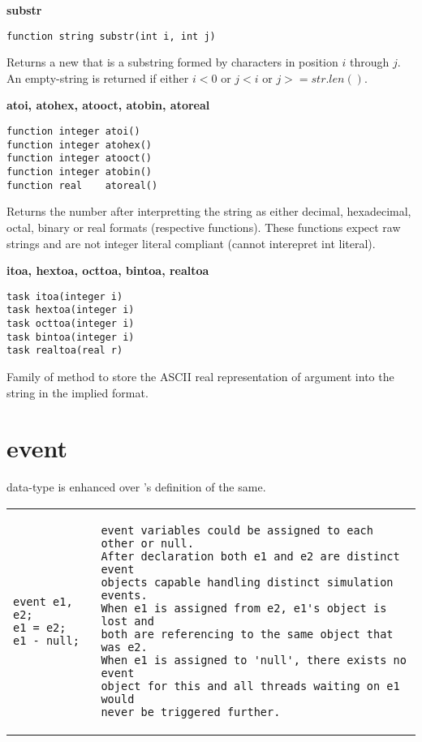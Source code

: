 \begin{description}
\item{{\bf substr}}
\begin{Verbatim}[formatcom=\color{blue}, fillcolor=\color{cyan}]
function string substr(int i, int j)
\end{Verbatim}
Returns a new \kwstring that is a substring formed by characters in
position $i$ through $j$. An empty-string is returned if either $i <
0$ or $j < i$ or $j >= str.len()$.

\item{{\bf atoi, atohex, atooct, atobin, atoreal}}
\begin{Verbatim}[formatcom=\color{blue}, fillcolor=\color{cyan}]
function integer atoi()
function integer atohex()
function integer atooct()
function integer atobin()
function real    atoreal()
\end{Verbatim}
Returns the number after interpretting the string as either decimal,
hexadecimal, octal, binary or real formats (respective
functions). These functions expect raw strings and are not \lvlog
integer literal compliant (cannot interepret \lvlog int literal).

\item{{\bf itoa, hextoa, octtoa, bintoa, realtoa}}
\begin{Verbatim}[formatcom=\color{blue}, fillcolor=\color{cyan}]
task itoa(integer i)
task hextoa(integer i)
task octtoa(integer i)
task bintoa(integer i)
task realtoa(real r)
\end{Verbatim}
Family of method to store the ASCII real representation of argument
into the string in the implied format.

\end{description}



\section{event}
\kwevent data-type is enhanced over \lvlog's definition of the same.

\begin{table}
\begin{tabular}{p{} p{}}

\begin{Verbatim}
event e1, e2;
e1 = e2;
e1 - null;
\end{Verbatim}
&
\begin{tbldesc}
\begin{verbatim}
event variables could be assigned to each other or null.
After declaration both e1 and e2 are distinct event
objects capable handling distinct simulation events.
When e1 is assigned from e2, e1's object is lost and
both are referencing to the same object that was e2.
When e1 is assigned to 'null', there exists no event
object for this and all threads waiting on e1 would
never be triggered further.
\end{verbatim}
\end{tbldesc}

\end{tabular}
\end{table}


